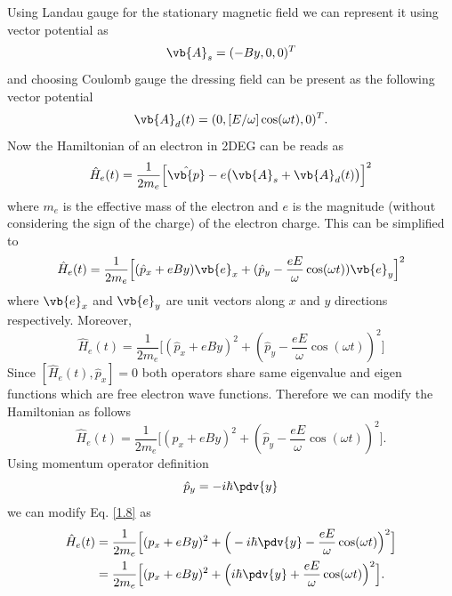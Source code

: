 \noindent
Using Landau gauge for the stationary magnetic field we can represent it using vector potential as
\begin{equation} \label{1.3}
  \vb{A}_{s} = (-By,0,0)^T
\end{equation}
and choosing Coulomb gauge the dressing field can be present as the following vector potential
\begin{equation} \label{1.4}
  \vb{A}_{d}(t) = (0,[E/\omega ]\cos(\omega t),0)^T.
\end{equation}
Now the Hamiltonian of an electron in 2DEG can be reads as
\begin{equation} \label{1.5}
  \hat{H}_e(t) = \frac{1}{2m_e}\Big[\hat{\vb{p}} - e\big(\vb{A}_{s}+\vb{A}_{d}(t)\big)\Big]^2
\end{equation}
where $m_e$ is the effective mass of the electron and $e$ is the magnitude (without considering the sign of the charge) of the electron charge. This can be simplified to
\begin{equation} \label{1.6}
  \hat{H}_e(t) = \frac{1}{2m_e}\Big[
    (\hat{p}_x + eBy)\vb{e}_x +
    (\hat{p}_y - \frac{eE}{\omega}\cos(\omega t))\vb{e}_y
  \Big]^2
\end{equation}
where $\vb{e}_x$ and $\vb{e}_y$ are unit vectors along $x$ and $y$ directions respectively. Moreover,
\begin{equation} \label{1.7}
  \hat{H}_e(t) = \frac{1}{2m_e}\Big[
    (\hat{p}_x + eBy)^2 +
    (\hat{p}_y - \frac{eE}{\omega}\cos(\omega t))^2
  \Big]
\end{equation}
Since $[\hat{H}_e(t),\hat{p}_x] =0$ both operators share same eigenvalue and eigen functions which are free electron wave functions. Therefore we can modify the Hamiltonian as follows
\begin{equation} \label{1.8}
  \hat{H}_e(t) = \frac{1}{2m_e}\Big[
    ({p}_x + eBy)^2 +
    (\hat{p}_y - \frac{eE}{\omega}\cos(\omega t))^2
  \Big].
\end{equation}
Using momentum operator definition
\begin{equation} \label{1.9}
  \hat{p}_y = -i\hbar \pdv{y}
\end{equation}
we can modify Eq. \eqref{1.8} as
\begin{equation} \label{1.10}
  \begin{aligned}
    \hat{H}_e(t) & = \frac{1}{2m_e}\Big[
      ({p}_x + eBy)^2 +
      \Big(-i\hbar \pdv{y}- \frac{eE}{\omega}\cos(\omega t)\Big)^2
    \Big] \\
    & = \frac{1}{2m_e}\Big[
      ({p}_x + eBy)^2 +
      \Big(i\hbar \pdv{y} + \frac{eE}{\omega}\cos(\omega t)\Big)^2
    \Big].
  \end{aligned}
\end{equation}
